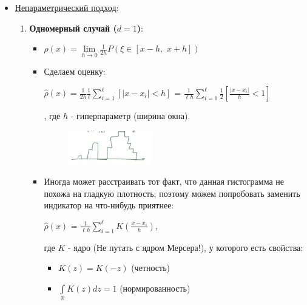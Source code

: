 \begin{enumerate}
\begin{enumerate}
\begin{itemize}
\begin{itemize}
                             \item  \underline{Непараметрический подход}:
                                \begin{enumerate}
                                    \item \textbf{Одномерный случай ($d = 1$)}:
                                    \begin{itemize}
                                        \item $\rho(x) = \lim\limits_{h \to 0} \frac{1}{2h} P(\xi \in [x - h, \,\, x + h])$

                                        \item Сделаем оценку:
                                        \begin{center}
                                        \large
                                            $\hat{\rho}(x) = \frac{1}{2h} \frac{1}{\ell} \sum\limits_{i = 1}^\ell [|x - x_i| < h]$ = $\frac{1}{\ell h} \sum\limits_{i = 1}^\ell  \frac{1}{2} [\frac{|x - x_i|}{h} < 1]$
                                        \end{center},
                                        где $h$ - гиперпараметр (ширина окна).

                                        \begin{figure}[H]
                                            \centering
                                            \includegraphics[width=0.4\textwidth]{images/18lecture/1d_statistic_method_p_choose.png}
                                        \end{figure}

                                        \item Иногда может расстраивать тот факт, что данная гистограмма не похожа на гладкую плотность, поэтому можем попробовать заменить индикатор на что-нибудь приятнее:
                                        \begin{center}
                                            \large
                                            $\hat{\rho}(x)$ = $\frac{1}{\ell h} \sum\limits_{i = 1}^\ell  K(\frac{x - x_i}{h})$,
                                        \end{center}
                                        где $K$ - ядро (Не путать с ядром Мерсера!), у которого есть свойства:
                                        \begin{itemize}
                                            \item $K(z) = K(-z)$ (четность)
                                            \item $\int\limits_{\mathbb{R}} K(z)dz = 1$ (нормированность)


\end{itemize}
\end{itemize}
\end{enumerate}
\end{itemize}
\end{itemize}
\end{enumerate}
\end{enumerate}
